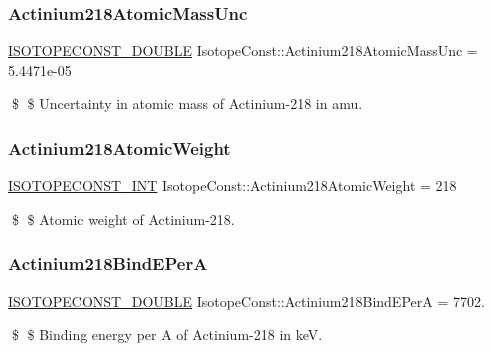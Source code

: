 \subsubsection{\texorpdfstring{Actinium218\+Atomic\+Mass\+Unc}{Actinium218AtomicMassUnc}}
{\footnotesize\ttfamily \mbox{\hyperlink{group___isotope_const-_macros_ga8f45a7272ce02c0b4c65c44636ed719a}{I\+S\+O\+T\+O\+P\+E\+C\+O\+N\+S\+T\+\_\+\+D\+O\+U\+B\+LE}} Isotope\+Const\+::\+Actinium218\+Atomic\+Mass\+Unc = 5.\+4471e-\/05}

\$ \$ Uncertainty in atomic mass of Actinium-\/218 in amu. \mbox{\label{group___isotope_const-_actinium-_ac218_gadd5dbfc8a9d0bf2a834fada140a498de}} 
\subsubsection{\texorpdfstring{Actinium218\+Atomic\+Weight}{Actinium218AtomicWeight}}
{\footnotesize\ttfamily \mbox{\hyperlink{group___isotope_const-_macros_ga5f18360b3e99483a35c32d789e62621c}{I\+S\+O\+T\+O\+P\+E\+C\+O\+N\+S\+T\+\_\+\+I\+NT}} Isotope\+Const\+::\+Actinium218\+Atomic\+Weight = 218}

\$ \$ Atomic weight of Actinium-\/218. \mbox{\label{group___isotope_const-_actinium-_ac218_gaa62145bc657203293fc74966b32c1ed6}} 
\subsubsection{\texorpdfstring{Actinium218\+Bind\+E\+PerA}{Actinium218BindEPerA}}
{\footnotesize\ttfamily \mbox{\hyperlink{group___isotope_const-_macros_ga8f45a7272ce02c0b4c65c44636ed719a}{I\+S\+O\+T\+O\+P\+E\+C\+O\+N\+S\+T\+\_\+\+D\+O\+U\+B\+LE}} Isotope\+Const\+::\+Actinium218\+Bind\+E\+PerA = 7702.}

\$ \$ Binding energy per A of Actinium-\/218 in keV. \mbox{\label{group___isotope_const-_actinium-_ac218_gadd7b4cf2ef641a36acb37cdb1b699482}} 
